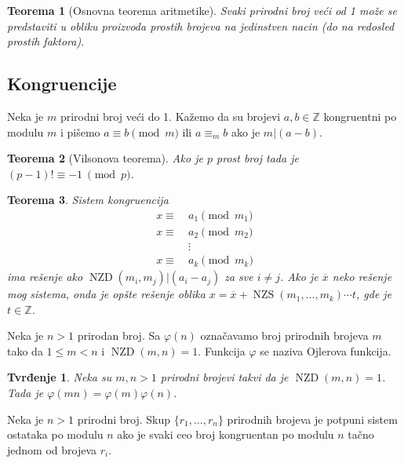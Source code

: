 \documentclass[12p,14paper]{article}
\DeclareMathOperator{\nzd}{NZD}
\DeclareMathOperator{\nzs}{NZS}
\newtheorem*{theorem}{Teorema}
\newtheorem*{prop}{Tvrđenje}
\begin{document}
\begin{multicols}{2}
    \begin{theorem}[Osnovna teorema aritmetike]
        Svaki prirodni broj veći od 1 može se predstaviti u obliku proizvoda 
        prostih brojeva na jedinstven nacin (do na redosled prostih faktora).
    \end{theorem}

\subsection{Kongruencije}

    Neka je $m$ prirodni broj veći do 1. Kažemo da su brojevi 
    $a, b \in \mathbb{Z}$ kongruentni po modulu $m$ i pišemo 
    $a \equiv b \pmod m$ ili $a \equiv_m b$ ako je $m | (a - b)$.

    \begin{theorem}[Vilsonova teorema]
        Ako je $p$ prost broj tada je $(p - 1)! \equiv -1\ \pmod p$.
    \end{theorem}

    \begin{theorem}
        Sistem kongruencija
        \begin{align*}
            x \equiv\ & a_1 \pmod m_1 \\
            x \equiv\ & a_2 \pmod m_2 \\
            & \vdots \\
            x \equiv\ & a_k \pmod m_k 
        \end{align*}
        ima rešenje ako $\nzd(m_i, m_j) | (a_i - a_j)$ za sve $i \neq j$. Ako
        je $\overline{x}$ neko rešenje mog sistema, onda je opšte rešenje 
        oblika $x = \overline{x} + \nzs(m_1, \ldots, m_k) \cdots t$, gde je 
        $t \in \mathbb{Z}$.
    \end{theorem}

    Neka je $n > 1$ prirodan broj. Sa $\varphi (n)$ označavamo broj prirodnih 
    brojeva $m$ tako da $1 \leq m < n$ i $\nzd(m, n) = 1$. Funkcija $\varphi$ 
    se naziva Ojlerova funkcija.

    \begin{prop}
        Neka su $m, n > 1$ prirodni brojevi takvi da je $\nzd(m, n) = 1$. 
        Tada je $\varphi(mn) = \varphi(m)\varphi(n)$.
    \end{prop}

    Neka je $n > 1$ prirodni broj. Skup $\{ r_1, \ldots, r_n \}$ prirodnih 
    brojeva je potpuni sistem ostataka po modulu $n$ ako je svaki ceo broj 
    kongruentan po modulu $n$ tačno jednom od brojeva $r_i$.


\end{multicols}
\end{document}
